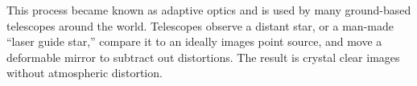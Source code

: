 This process became known as adaptive optics and is used by many ground-based telescopes around the world. Telescopes observe a distant star, or a man-made ``laser guide star,'' compare it to an ideally images point source, and move a deformable mirror to subtract out distortions. The result is crystal clear images without atmospheric distortion.

